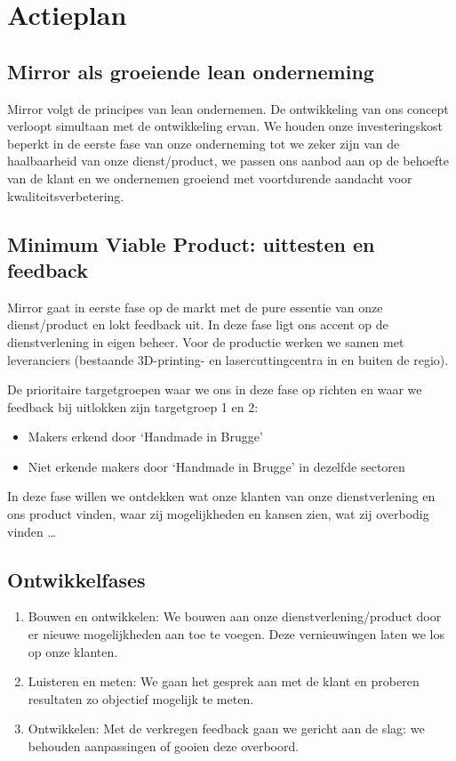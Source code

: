 \section{Actieplan} %
\label{sec:actieplan}
\subsection{Mirror als groeiende lean onderneming} %
\label{sub:mirror_als_groeiende_lean_onderneming}
Mirror volgt de principes van lean ondernemen\cite{lean-boekje}\cite{lean-enterprise}. De ontwikkeling van ons concept verloopt simultaan met de ontwikkeling ervan.  We houden onze investeringskost beperkt in de eerste fase van onze onderneming  tot we zeker zijn van de haalbaarheid van onze dienst/product, we passen ons aanbod aan op de behoefte van de klant en we ondernemen groeiend met voortdurende aandacht voor kwaliteitsverbetering.

\subsection{Minimum Viable Product: uittesten en feedback} %
\label{sub:minimum_viable_product_uittesten_en_feedback}
Mirror gaat in eerste fase op de markt met de pure essentie van onze dienst/product en lokt feedback uit. In deze fase ligt ons accent op de dienstverlening in eigen beheer. Voor de productie werken we samen met leveranciers (bestaande 3D-printing- en lasercuttingcentra in en buiten de regio).

De prioritaire targetgroepen waar we ons in deze fase op richten en waar we feedback bij uitlokken zijn targetgroep 1 en 2:

\begin{itemize}
  \item Makers erkend door `Handmade in Brugge'
  \item Niet erkende makers door `Handmade in Brugge' in dezelfde sectoren
\end{itemize}

In deze fase willen we ontdekken wat onze klanten van onze dienstverlening en ons product vinden, waar zij mogelijkheden en kansen zien, wat zij overbodig vinden …

\subsection{Ontwikkelfases} %
\label{sub:ontwikkelfases}
\begin{enumerate}
  \item Bouwen en ontwikkelen: We bouwen aan onze dienstverlening/product door er nieuwe mogelijkheden aan toe te voegen. Deze vernieuwingen laten we los op onze klanten.
  \item Luisteren en meten: We gaan het gesprek aan met de klant en proberen resultaten zo objectief mogelijk te meten.
  \item Ontwikkelen: Met de verkregen feedback gaan we gericht aan de slag: we behouden aanpassingen of gooien deze overboord.
\end{enumerate}

